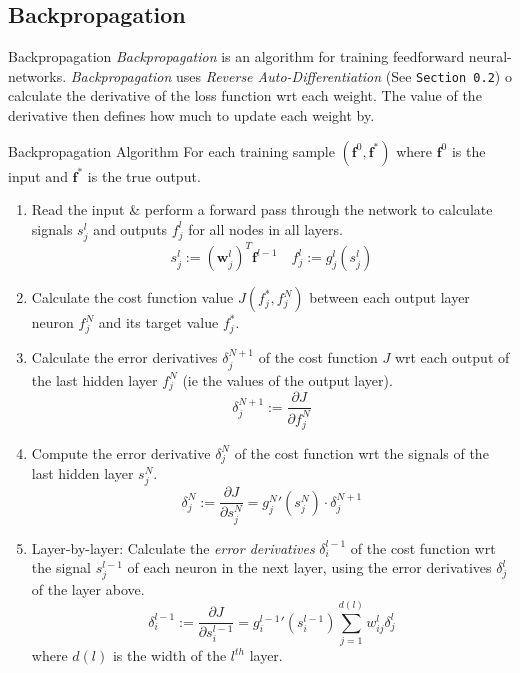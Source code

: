 \documentclass[11pt,a4paper]{article}
\begin{document}
\subsection{Backpropagation} \label{sec_Backpropagation}

  \begin{definition}{Backpropagation}
    \textit{Backpropagation} is an algorithm for training feedforward neural-networks. \textit{Backpropagation} uses \textit{Reverse Auto-Differentiation} (See \texttt{Section 0.2}) o calculate the derivative of the loss function wrt each weight. The value of the derivative then defines how much to update each weight by.
  \end{definition}

  \begin{proposition}{Backpropagation Algorithm}
    For each training sample $(\mathbf{f}^0,\mathbf{f}^*)$ where $\mathbf{f}^0$ is the input and $\mathbf{f}^*$ is the true output.
    \begin{enumerate}
      \item Read the input \& perform a forward pass through the network to calculate signals $s_j^l$ and outputs $f_j^l$ for all nodes in all layers.
      \[  s_j^l:=(\mathbf{w}_j^l)^T\mathbf{f}^{l-1}\quad f_j^l:=g_j^l(s_j^l) \]

      \item Calculate the cost function value $J(f_j^*,f_j^N)$ between each output layer neuron $f_j^N$ and its target value $f_j^*$.

      \item Calculate the error derivatives $\delta_j^{N+1}$ of the cost function $J$ wrt each output of the last hidden layer $f_j^N$ (ie the values of the output layer).
      \[ \delta_j^{N+1}:=\frac{\partial J}{\partial f_j^N} \]

      \item Compute the error derivative $\delta_j^N$ of the cost function wrt the signals of the last hidden layer $s_j^N$.
      \[ \delta_j^N:=\frac{\partial J}{\partial s_j^N}={g_j^N}'(s_j^N)\cdot\delta_j^{N+1} \]

      \item Layer-by-layer: Calculate the \textit{error derivatives} $\delta_i^{l-1}$ of the cost function wrt the signal $s_j^{l-1}$  of each neuron in the next layer, using the error derivatives $\delta_j^l$ of the layer above.
      \[ \delta_i^{l-1}:=\frac{\partial J}{\partial s_i^{l-1}}={g_i^{l-1}}'(s_i^{l-1})\sum_{j=1}^{d(l)}w_{ij}^l\delta_j^l \]
      where $d(l)$ is the width of the $l^{th}$ layer.


\end{enumerate}
\end{proposition}
\end{document}
